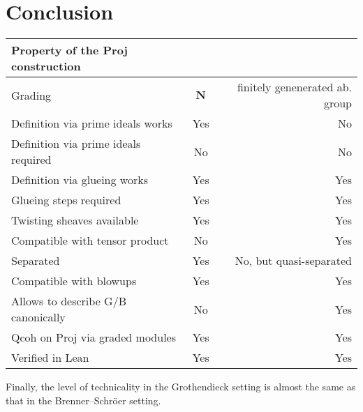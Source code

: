 \documentclass[graybox]{svmult}
\begin{document}
\section{Conclusion}
\begin{tabular}{|l|c|r|}
  \hline
  \textbf{Property of the Proj construction} & \cite{Gr61}  & \cite{BS03,MR24} \\
  \hline
  Grading & $\mathbf{N} $ & finitely genenerated ab. group \\
  \hline
  Definition via prime ideals works & Yes & No\\
   \hline
  Definition via prime ideals required & No & No\\
  \hline
  Definition via glueing works & Yes & Yes\\
  \hline 
  Glueing steps required & Yes & Yes \\ 
  \hline
  Twisting sheaves available & Yes & Yes \\ 
  \hline
 Compatible with tensor product & No & Yes \\ 
  \hline
  Separated & Yes & No, but quasi-separated \\
  \hline 
  Compatible with blowups & Yes & Yes \\
  \hline 
  Allows to describe G/B canonically  & No & Yes \\
  \hline 
  Qcoh on Proj via graded modules   & Yes & Yes \\
  \hline 
  Verified in Lean    & Yes & Yes \\
  \hline 
\end{tabular}
Finally, the level of technicality in the Grothendieck setting is almost the same as that in the Brenner–Schröer setting.
\end{document}
